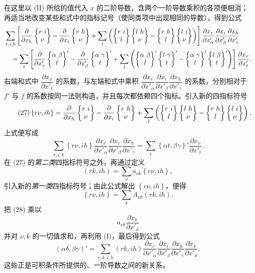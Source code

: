 在这里以 (II) 所给的值代入 $x$ 的二阶导数，含两个一阶导数乘积的各项便相消；再适当地改变某些和式中的指标记号（使同类项中出现相同的导数），得到公式
\[
\begin{aligned}
&\sum_{r,i,h}\left[\frac{\partial}{\partial x_h}\left\{\begin{matrix}r\ i\\ \nu\end{matrix}\right\}-\frac{\partial}{\partial x_i}\left\{\begin{matrix}r\ h\\ \nu\end{matrix}\right\}
+\sum_l\left(\left\{\begin{matrix}r\ i\\ l\end{matrix}\right\}\left\{\begin{matrix}l\ h\\ \nu\end{matrix}\right\}-\left\{\begin{matrix}r\ h\\ l\end{matrix}\right\}\left\{\begin{matrix}l\ i\\ \nu\end{matrix}\right\}\right)\right]
\frac{\partial x_r}{\partial x'_\alpha}\frac{\partial x_i}{\partial x'_\beta}\frac{\partial x_h}{\partial x'_\gamma}\\
&\quad =\sum_t\left[\frac{\partial}{\partial x'_\gamma}\left\{\begin{matrix}\alpha\ \beta\\ t\end{matrix}\right\}'-\frac{\partial}{\partial x'_\beta}\left\{\begin{matrix}\alpha\ \gamma\\ t\end{matrix}\right\}'
+\sum_l\left(\left\{\begin{matrix}\alpha\ \beta\\ l\end{matrix}\right\}'\left\{\begin{matrix}l\ \gamma\\ t\end{matrix}\right\}'-\left\{\begin{matrix}\alpha\ \gamma\\ l\end{matrix}\right\}'\left\{\begin{matrix}l\ \beta\\ t\end{matrix}\right\}'\right)\right]
\frac{\partial x_\nu}{\partial x'_t}.
\end{aligned}
\]
右端和式中 $\dfrac{\partial x_\nu}{\partial x'_t}$ 的系数，与左端和式中乘积 $\dfrac{\partial x_r}{\partial x'_\alpha}\dfrac{\partial x_i}{\partial x'_\beta}\dfrac{\partial x_h}{\partial x'_\gamma}$ 的系数，分别相对于 $f'$ 与 $f$ 的系数按同一法则构造，并且每次都依赖四个指标。引入新的四指标符号
\begin{equation}\tag{27}
\left\{r\nu,ih\right\}=\frac{\partial}{\partial x_h}\left\{\begin{matrix}r\ i\\ \nu\end{matrix}\right\}-\frac{\partial}{\partial x_i}\left\{\begin{matrix}r\ h\\ \nu\end{matrix}\right\}
+\sum_l\left(\left\{\begin{matrix}r\ i\\ l\end{matrix}\right\}\left\{\begin{matrix}l\ h\\ \nu\end{matrix}\right\}-\left\{\begin{matrix}r\ h\\ l\end{matrix}\right\}\left\{\begin{matrix}l\ i\\ \nu\end{matrix}\right\}\right),
\end{equation}
上式便写成
\begin{equation}\tag{28}
\sum_{r,i,h}\left\{r\nu,ih\right\}\frac{\partial x_r}{\partial x'_\alpha}\frac{\partial x_i}{\partial x'_\beta}\frac{\partial x_h}{\partial x'_\gamma}
=\sum_t\left\{\alpha t,\beta\gamma\right\}'\frac{\partial x_\nu}{\partial x'_t}.
\end{equation}
在 (27) 的\emph{第二类}四指标符号之外，再通过定义
\begin{equation}\tag{29}
(rk,ih)=\sum_\nu a_{\nu k}\left\{r\nu,ih\right\},
\end{equation}
引入新的\emph{第一类}四指标符号；由此公式解出 $\left\{r\nu,ih\right\}$，便得
\begin{equation}\tag{29*}
\left\{r\nu,ih\right\}=\sum_k A_{\nu k}(rk,ih).
\end{equation}
把 (28) 乘以
\[
a_{\nu k}\frac{\partial x_k}{\partial x'_\delta}
\]
并对 $\nu,k$ 的一切值求和，再利用 (I)，最后得到公式
\begin{equation}\tag{III}
(\alpha\delta,\beta\gamma)'=\sum_{r,k,i,h}(rk,ih)\frac{\partial x_r}{\partial x'_\alpha}\frac{\partial x_i}{\partial x'_\beta}\frac{\partial x_h}{\partial x'_\gamma}\frac{\partial x_k}{\partial x'_\delta},
\end{equation}
这些正是可积条件所提供的、一阶导数之间的新关系。

